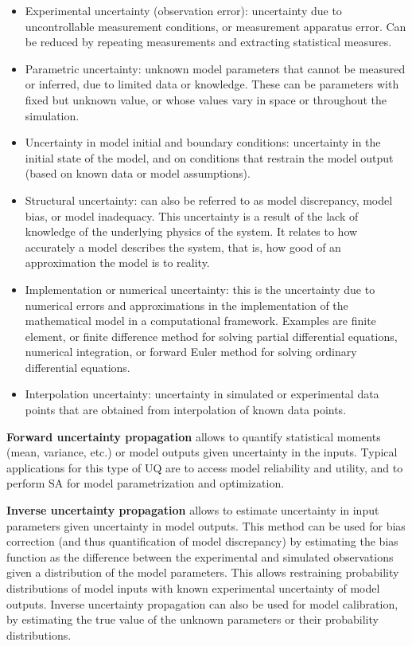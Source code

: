\documentclass[12pt]{article}
\begin{document}
 \begin{itemize} \label{list:uncertainties}
 	\item Experimental uncertainty (observation error): uncertainty due to uncontrollable measurement conditions, or measurement apparatus error. Can be reduced by repeating measurements and extracting statistical measures. 
 	
 	\item Parametric uncertainty: unknown model parameters that cannot be measured or inferred, due to limited data or knowledge. These can be  parameters with fixed but unknown value, or whose values vary in space or throughout the simulation. 
 	
 	\item Uncertainty in model initial and boundary conditions: uncertainty in the initial state of the model, and on conditions that restrain the model output (based on known data or model assumptions). 
 	
 	\item Structural uncertainty: can also be referred to as model discrepancy, model bias, or model inadequacy. This uncertainty is a result of the lack of knowledge of the underlying physics of the system. It relates to how accurately a model describes the system, that is, how good of an approximation the model is to reality.
 	
 	\item Implementation or numerical uncertainty: this is the uncertainty due to numerical errors and approximations in the implementation of the mathematical model in a computational framework. Examples are finite element, or finite difference method for solving partial differential equations, numerical integration, or forward Euler method for solving ordinary differential equations.  
 	
 	\item Interpolation uncertainty: uncertainty in simulated or experimental data points that are obtained from interpolation of known data points.
 \end{itemize}  
 
 \textbf{Forward uncertainty propagation} allows to quantify statistical moments (mean, variance, etc.) or model outputs given uncertainty in the inputs. Typical applications for this type of UQ are to access model reliability and utility, and to perform SA for model parametrization and optimization.
 
 \textbf{Inverse uncertainty propagation} allows to estimate uncertainty in input parameters given uncertainty in model outputs. This method can be used for bias correction (and thus quantification of model discrepancy) by estimating the bias function as the difference between the experimental and simulated observations given a distribution of the model parameters. This allows restraining probability distributions of model inputs with known experimental uncertainty of model outputs. Inverse uncertainty propagation can also be used for model calibration, by estimating the true value of the unknown parameters or their probability distributions.
 
\end{document}
